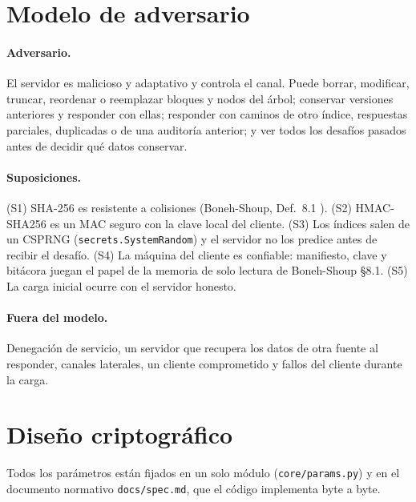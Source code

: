 \documentclass[11pt,a4paper]{article}
\newcommand{\code}[1]{\texttt{#1}}
\begin{document}
\section{Modelo de adversario}
\label{sec:adversario}

\paragraph{Adversario.} El servidor es malicioso y adaptativo y controla el canal. Puede borrar,
modificar, truncar, reordenar o reemplazar bloques y nodos del árbol; conservar versiones anteriores
y responder con ellas; responder con caminos de otro índice, respuestas parciales, duplicadas o de
una auditoría anterior; y ver todos los desafíos pasados antes de decidir qué datos conservar.

\paragraph{Suposiciones.} (S1) SHA-256 es resistente a colisiones (Boneh-Shoup, Def.~8.1
\cite{bs23}). (S2) HMAC-SHA256 es un MAC seguro con la clave local del cliente. (S3) Los índices
salen de un CSPRNG (\code{secrets.SystemRandom}) y el servidor no los predice antes de recibir el
desafío. (S4) La máquina del cliente es confiable: manifiesto, clave y bitácora juegan el papel de
la memoria de solo lectura de Boneh-Shoup §8.1. (S5) La carga inicial ocurre con el servidor honesto.

\paragraph{Fuera del modelo.} Denegación de servicio, un servidor que recupera los datos de otra
fuente al responder, canales laterales, un cliente comprometido y fallos del cliente durante la carga.

\section{Diseño criptográfico}
\label{sec:diseno}

Todos los parámetros están fijados en un solo módulo (\code{core/params.py}) y en el documento
normativo \code{docs/spec.md}, que el código implementa byte a byte.
\end{document}
